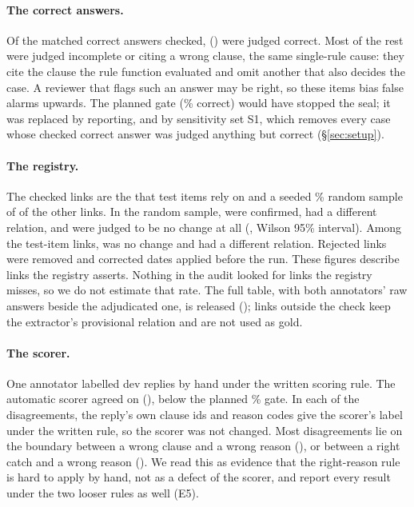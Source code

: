 \paragraph{The correct answers.}
Of the \NControlsChecked{} matched correct answers checked, \NControlsCorrect{} (\PctControlsCorrect) were judged correct.
Most of the rest were judged incomplete or citing a wrong clause, the same single-rule cause: they cite the clause the
rule function evaluated and omit another that also decides the case. A reviewer that flags such an answer may be right,
so these items bias false alarms upwards. The planned gate (\ControlsGatePct\% correct) would have stopped the seal; it
was replaced by reporting, and by sensitivity set S1, which removes every case whose checked correct answer was judged
anything but correct (\S\ref{sec:setup}).

\paragraph{The registry.}
The \NLinksAnnotated{} checked links are the \NLinksUsed{} that test items rely on and a seeded \LinkSamplePct\% random
sample of \NLinksSample{} of the other links. In the random sample, \NLinksSampleConfirmed{} were confirmed,
\NLinksSampleRelChanged{} had a different relation, and \NLinksSampleNotALink{} were judged to be no change at all
(\CINotALinkSample{}, Wilson 95\% interval). Among the test-item links, \NLinksTestPairNotALink{} was no change and
\NLinksTestPairRelChanged{} had a different relation. Rejected links were removed and corrected dates applied before
the run. These figures describe links the registry asserts. Nothing in the audit looked for links the registry misses,
so we do not estimate that rate. The full table, with both annotators' raw answers beside the adjudicated one, is
released (); links outside the check keep the extractor's provisional relation and are not
used as gold.

\paragraph{The scorer.}
One annotator labelled \ScorerCheckN{} dev replies by hand under the written scoring rule. The automatic scorer agreed on
\ScorerCheckAgreeN{} (\ScorerCheckPctObserved), below the planned \ScorerCheckPct\% gate. In each of the
\NScorerDisagree{} disagreements, the reply's own clause ids and reason codes give the scorer's label under the written
rule, so the scorer was not changed. Most disagreements lie on the boundary between a wrong clause and a wrong reason
(\NScorerClauseReason{}), or between a right catch and a wrong reason (\NScorerCatchReason{}). We read this as evidence
that the right-reason rule is hard to apply by hand, not as a defect of the scorer, and report every result under the
two looser rules as well (E5).

